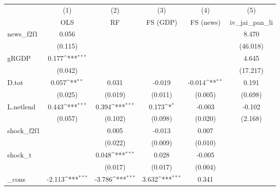 {
\def\sym#1{\ifmmode^{#1}\else\(^{#1}\)\fi}
\begin{tabular}{l*{5}{c}}
\toprule
            &\multicolumn{1}{c}{(1)}&\multicolumn{1}{c}{(2)}&\multicolumn{1}{c}{(3)}&\multicolumn{1}{c}{(4)}&\multicolumn{1}{c}{(5)}\\
            &\multicolumn{1}{c}{OLS}&\multicolumn{1}{c}{RF}&\multicolumn{1}{c}{FS (GDP)}&\multicolumn{1}{c}{FS (news)}&\multicolumn{1}{c}{iv\_jai\_pan\_li}\\
\midrule
news\_f2f1   &       0.056         &                     &                     &                     &       8.470         \\
            &     (0.115)         &                     &                     &                     &    (46.018)         \\
\addlinespace
gRGDP       &       0.177\sym{***}&                     &                     &                     &       4.645         \\
            &     (0.042)         &                     &                     &                     &    (17.217)         \\
\addlinespace
D.tot       &       0.057\sym{**} &       0.031         &      -0.019         &      -0.014\sym{**} &       0.191         \\
            &     (0.025)         &     (0.019)         &     (0.011)         &     (0.005)         &     (0.698)         \\
\addlinespace
L.netlend   &       0.443\sym{***}&       0.394\sym{***}&       0.173\sym{*}  &      -0.003         &      -0.102         \\
            &     (0.057)         &     (0.102)         &     (0.098)         &     (0.020)         &     (2.168)         \\
\addlinespace
shock\_f2f1  &                     &       0.005         &      -0.013         &       0.007         &                     \\
            &                     &     (0.022)         &     (0.009)         &     (0.010)         &                     \\
\addlinespace
shock\_t     &                     &       0.048\sym{***}&       0.028         &      -0.005         &                     \\
            &                     &     (0.017)         &     (0.017)         &     (0.004)         &                     \\
\addlinespace
\_cons      &      -2.113\sym{***}&      -3.786\sym{***}&       3.632\sym{***}&       0.341         &                     \\

\end{tabular}}

